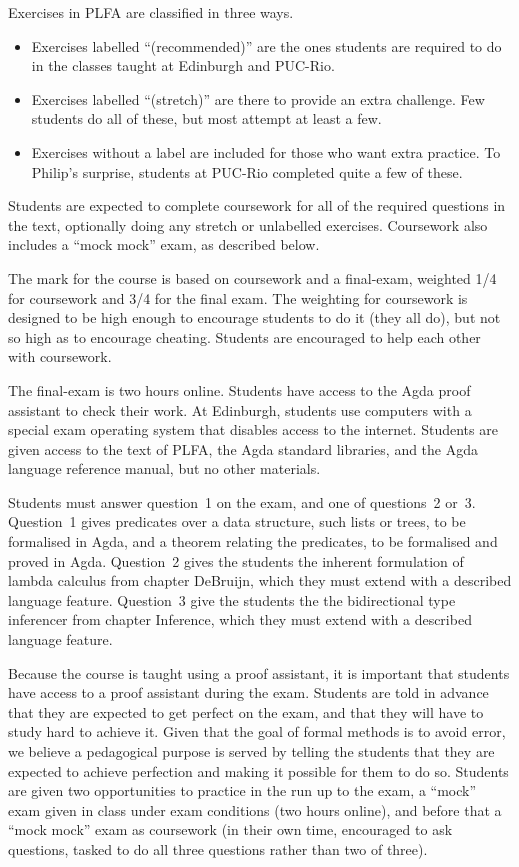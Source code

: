 \documentclass[preprint,authoryear]{elsarticle}
\begin{document}
Exercises in PLFA are classified in three ways.
\begin{itemize}
\item
  Exercises labelled “(recommended)” are the ones students are
  required to do in the classes taught at Edinburgh and PUC-Rio.

\item
  Exercises labelled “(stretch)” are there to provide an extra
  challenge. Few students do all of these, but most attempt at least a
  few.

\item
  Exercises without a label are included for those who want extra
  practice.  To Philip's surprise, students at PUC-Rio completed
  quite a few of these.
\end{itemize}
Students are expected to complete coursework for all of the
required questions in the text, optionally doing any stretch or
unlabelled exercises. Coursework also includes a ``mock mock''
exam, as described below.

The mark for the course is based on coursework and a final-exam,
weighted 1/4 for coursework and 3/4 for the final exam.  The weighting
for coursework is designed to be high enough to encourage students to
do it (they all do), but not so high as to encourage cheating.
Students are encouraged to help each other with coursework.

The final-exam is two hours online. Students have access to the Agda
proof assistant to check their work.  At Edinburgh, students use
computers with a special exam operating system that disables access
to the internet.  Students are given access to the text of PLFA,
the Agda standard libraries, and the Agda language reference manual,
but no other materials.

Students must answer question~1 on the exam, and one of questions~2
or~3.  Question~1 gives predicates over a data structure, such lists or
trees, to be formalised in Agda, and a theorem relating the
predicates, to be formalised and proved in Agda.  Question~2 gives the
students the inherent formulation of lambda calculus from chapter
DeBruijn, which they must extend with a described language feature.
Question~3 give the students the the bidirectional type inferencer
from chapter Inference, which they must extend with a described
language feature.

Because the course is taught using a proof assistant, it is important
that students have access to a proof assistant during the exam.
Students are told in advance that they are expected to get perfect on
the exam, and that they will have to study hard to achieve it.
Given that the goal of formal methods is to avoid error, we believe a
pedagogical purpose is served by telling the students that they are
expected to achieve perfection and making it possible for them to do
so.  Students are given two opportunities to practice in the run up to
the exam, a ``mock'' exam given in class under exam conditions (two
hours online), and before that a ``mock mock'' exam as coursework (in
their own time, encouraged to ask questions, tasked to do all three
questions rather than two of three).
\end{document}
